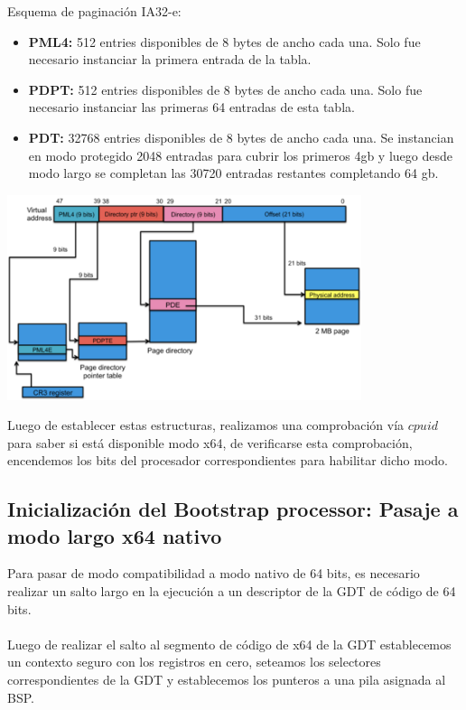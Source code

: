     Esquema de paginación IA32-e:
    \begin{itemize}

        \item \textbf{PML4: } 512 entries disponibles de 8 bytes de ancho cada una. Solo fue necesario instanciar la primera entrada de la tabla.

        \item \textbf{PDPT: } 512 entries disponibles de 8 bytes de ancho cada una. 
        Solo fue necesario instanciar las primeras 64 entradas de esta tabla.

        \item \textbf{PDT: } 32768 entries disponibles de 8 bytes de ancho cada una.
        Se instancian en modo protegido 2048 entradas para cubrir los primeros 4gb y luego desde modo largo se completan las 30720 entradas restantes completando 64 gb.
    \end{itemize}

    \begin{center}
        \includegraphics[height=6cm]{images/ia32e-overview-paging.png}
    \end{center}

	Luego de establecer estas estructuras, realizamos una comprobación vía $cpuid$ para saber si está disponible modo x64, de verificarse esta comprobación, encendemos los bits del procesador correspondientes para habilitar dicho modo.

    \subsection{Inicialización del Bootstrap processor: Pasaje a modo largo x64 nativo}

    Para pasar de modo compatibilidad a modo nativo de 64 bits, es necesario realizar un salto largo en la ejecución a un descriptor de la GDT de código de 64 bits.\\
    \\
    Luego de realizar el salto al segmento de código de x64 de la GDT establecemos un contexto seguro con los registros en cero, seteamos los selectores correspondientes de la GDT y establecemos los punteros a una pila asignada al BSP.

